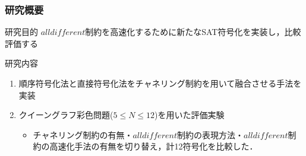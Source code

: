 \documentclass [dvipdfmx,11pt]{beamer}
\newcommand{\alldifferent}{$alldifferent$}
\begin{document}
\begin{frame}
    \frametitle{研究概要}
    \begin{alertblock}{研究目的}
        {\alldifferent}制約を高速化するために新たなSAT符号化を実装し，比較評価する
    \end{alertblock}
    \begin{block}{研究内容}
        \begin{enumerate}
            \item 順序符号化法と直接符号化法をチャネリング制約を用いて融合させる手法を実装
            \item クイーングラフ彩色問題($5\leq N \leq 12$)を用いた評価実験
                \begin{itemize}
                    \item チャネリング制約の有無・{\alldifferent}制約の表現方法・{\alldifferent}制約の高速化手法の有無を切り替え，計12符号化を比較した．
                \end{itemize}
        \end{enumerate}
    \end{block}
\end{frame}
\end{document}
